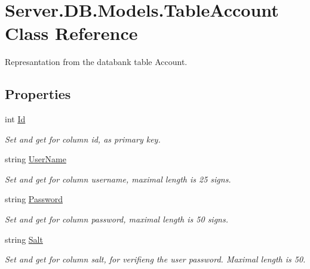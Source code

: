 \hypertarget{classServer_1_1DB_1_1Models_1_1TableAccount}{\section{Server.\-D\-B.\-Models.\-Table\-Account Class Reference}
\label{classServer_1_1DB_1_1Models_1_1TableAccount}
}


Represantation from the databank table Account.  


\subsection*{Properties}
\begin{DoxyCompactItemize}
\item 
int \hyperlink{classServer_1_1DB_1_1Models_1_1TableAccount_a2bc49cfaddd688fde3be961d9491bdae}{Id}
\begin{DoxyCompactList}\small\item\em Set and get for column id, as primary key. \end{DoxyCompactList}\item 
string \hyperlink{classServer_1_1DB_1_1Models_1_1TableAccount_ad35a3a996444afd590e747e4e4064100}{User\-Name}
\begin{DoxyCompactList}\small\item\em Set and get for column username, maximal length is 25 signs. \end{DoxyCompactList}\item 
string \hyperlink{classServer_1_1DB_1_1Models_1_1TableAccount_ae2e067ab09522520d715b4cf51386cd9}{Password}
\begin{DoxyCompactList}\small\item\em Set and get for column password, maximal length is 50 signs. \end{DoxyCompactList}\item 
string \hyperlink{classServer_1_1DB_1_1Models_1_1TableAccount_a5d4782aec9c4515ec3158831df9048af}{Salt}
\begin{DoxyCompactList}\small\item\em Set and get for column salt, for verifieng the user password. Maximal length is 50. \end{DoxyCompactList}\end{DoxyCompactItemize}



